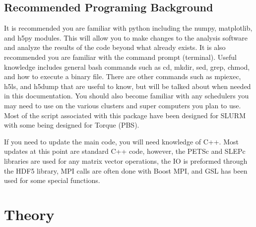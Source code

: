 \documentclass{article}
\begin{document}
\subsection{Recommended Programing Background} %
\label{sub:recommended_programing_background}
It is recommended you are familiar with python including the numpy, matplotlib, and h5py modules. This will allow you to make changes to the analysis software and analyze the results of the code beyond what already exists. It is also recommended you are familiar with the command prompt (terminal). Useful knowledge includes general bash commands such as cd, mkdir, sed, grep, chmod, and how to execute a binary file. There are other commands such as mpiexec, h5ls, and h5dump that are useful to know, but will be talked about when needed in this documentation. You should also become familiar with any schedulers you may need to use on the various clusters and super computers you plan to use. Most of the script associated with this package have been designed for SLURM with some being designed for Torque (PBS).

If you need to update the main code, you will need knowledge of C++. Most updates at this point are standard C++ code, however, the PETSc and SLEPc libraries are used for any matrix vector operations, the IO is preformed through the HDF5 library, MPI calls are often done with Boost MPI, and GSL has been used for some special functions.

\section{Theory} %
\label{sec:theory}
\end{document}

